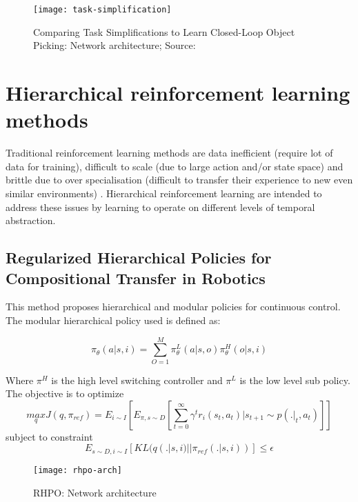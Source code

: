 \begin{figure}[H]
	\centering
	\texttt{[image: task-simplification]}
	\caption{Comparing Task Simplifications to Learn Closed-Loop Object Picking: Network architecture; Source: \cite{tasksimplification}}
	\label{fig:tasksimplification-network}
\end{figure}

\section{Hierarchical reinforcement learning methods}
Traditional reinforcement learning methods are data inefficient (require lot of data for training), difficult to scale (due to large action and/or state space) and brittle due to over specialisation (difficult to transfer their experience to new even similar environments) \cite{gradient}. Hierarchical reinforcement learning are intended to address these issues by learning to operate on different levels of temporal abstraction.

\subsection{Regularized Hierarchical Policies for Compositional Transfer in Robotics}
This method proposes \cite{wulfmeier2019regularized} hierarchical and modular policies for continuous control. The modular hierarchical policy used is defined as:

\begin{equation}
\pi_{\theta} (a | s, i) = \sum_{O=1}^{M} \pi_{\theta}^L(a | s, o) \pi_{\theta}^H(o | s, i)
\end{equation}

Where $\pi^H$ is the high level switching controller and $\pi^L$ is the low level sub policy. The objective is to optimize
\begin{equation}
\underset{q}{max} J(q, \pi_{ref}) = E_{i \sim I} \left[ E_{\pi, s \sim D} \left[ \sum_{t=0}^{\infty} \gamma^t r_i(s_t, a_t) | s_{t+1} \sim p(.|_t, a_t) \right] \right]
\end{equation}
subject to constraint
\begin{equation}
E_{s \sim D, i \sim I} \left[ KL(q(. | s, i) || \pi_{ref}(. | s, i)) \right] \leq \epsilon
\end{equation}

\begin{figure}[H]
	\centering
	\texttt{[image: rhpo-arch]}
	\caption{RHPO: Network architecture}
\end{figure}